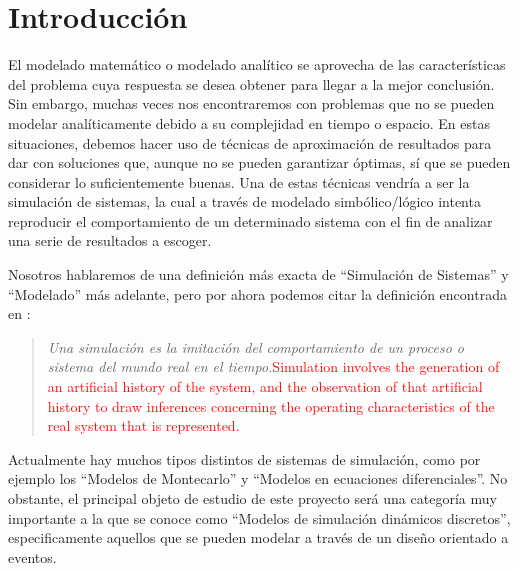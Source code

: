 \chapter{Introducción}\label{ch:introduccion}

El modelado matemático o modelado analítico se aprovecha de las características
del problema cuya respuesta se desea obtener para llegar a la mejor conclusión.
Sin embargo, muchas veces nos encontraremos con problemas que no se pueden
modelar analíticamente debido a su complejidad en tiempo o espacio. En estas
situaciones, debemos hacer uso de técnicas de aproximación de resultados para
dar con soluciones que, aunque no se pueden garantizar óptimas, sí que se pueden
considerar lo suficientemente buenas. Una de estas técnicas vendría a ser la
simulación de sistemas, la cual a través de modelado simbólico/lógico intenta
reproducir el comportamiento de un determinado sistema con el fin de analizar
una serie de resultados a escoger.

Nosotros hablaremos de una definición más exacta de “Simulación de Sistemas” y
“Modelado” más adelante, pero por ahora podemos citar la definición encontrada
en \cite{banks2010discrete-event}:

\begin{quote}
    \emph{Una simulación es la imitación del comportamiento de un proceso o
    sistema del mundo real en el tiempo.}\textcolor{red}{Simulation involves the
    generation of an artificial history of the system, and the observation of
    that artificial history to draw inferences concerning the operating
    characteristics of the real system that is represented.}
\end{quote}



Actualmente hay muchos tipos distintos de sistemas de simulación, como por
ejemplo los “Modelos de Montecarlo” y “Modelos en ecuaciones diferenciales”. No
obstante, el principal objeto de estudio de este proyecto será una categoría muy
importante a la que se conoce como “Modelos de simulación dinámicos discretos”,
especificamente aquellos que se pueden modelar a través de un diseño orientado a
eventos.


